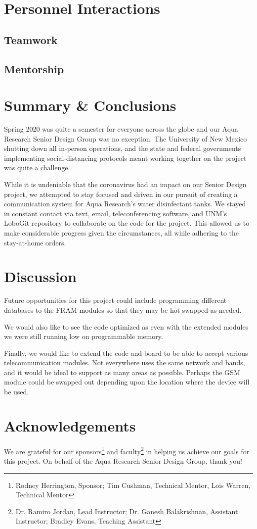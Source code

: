 \documentclass[12pt]{article}
\begin{document}
\section{Personnel Interactions}
\subsection{Teamwork}
\subsection{Mentorship}
\section{Summary \& Conclusions}
Spring 2020 was quite a semester for everyone across the globe and our Aqua Research Senior Design Group was no exception. The University of New Mexico shutting down all in-person operations, and the state and federal governments implementing social-distancing protocols meant working together on the project was quite a challenge.

\noindent While it is undeniable that the coronavirus had an impact on our Senior Design project, we attempted to stay focused and driven in our pursuit of creating a communication system for Aqua Research’s water disinfectant tanks. We stayed in constant contact via text, email, teleconferencing software, and UNM’s LoboGit repository to collaborate on the code for the project. This allowed us to make considerable progress given the circumstances, all while adhering to the stay-at-home orders.

\section{Discussion}
Future opportunities for this project could include programming different databases to the FRAM modules so that they may be hot-swapped as needed. 

\noindent We would also like to see the code optimized as even with the extended modules we were still running low on programmable memory.

\noindent Finally, we would like to extend the code and board to be able to accept various telecommunication modules. Not everywhere uses the same network and bands, and it would be ideal to support as many areas as possible. Perhaps the GSM module could be swapped out depending upon the location where the device will be used.
\section{Acknowledgements}
We are grateful for our sponsors\footnote{Rodney Herrington, Sponsor; Tim Cushman, Technical Mentor, Lois Warren, Technical Mentor} and faculty\footnote{Dr. Ramiro Jordan, Lead Instructor; Dr. Ganesh Balakrishnan, Assistant Instructor; Bradley Evans, Teaching Assistant} in helping us achieve our goals for this project. On behalf of the Aqua Research Senior Design Group, thank you!
\end{document}
